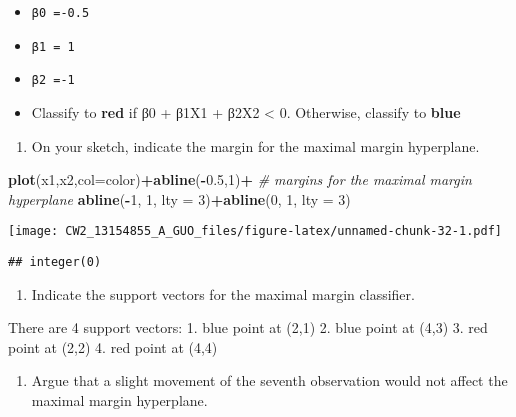 \documentclass[]{article}
\newenvironment{Shaded}{\begin{snugshade}}{\end{snugshade}}
\newcommand{\KeywordTok}[1]{\textcolor[rgb]{0.13,0.29,0.53}{\textbf{#1}}}
\newcommand{\DataTypeTok}[1]{\textcolor[rgb]{0.13,0.29,0.53}{#1}}
\newcommand{\DecValTok}[1]{\textcolor[rgb]{0.00,0.00,0.81}{#1}}
\newcommand{\FloatTok}[1]{\textcolor[rgb]{0.00,0.00,0.81}{#1}}
\newcommand{\StringTok}[1]{\textcolor[rgb]{0.31,0.60,0.02}{#1}}
\newcommand{\CommentTok}[1]{\textcolor[rgb]{0.56,0.35,0.01}{\textit{#1}}}
\newcommand{\OperatorTok}[1]{\textcolor[rgb]{0.81,0.36,0.00}{\textbf{#1}}}
\newcommand{\NormalTok}[1]{#1}
\providecommand{\tightlist}{%
  \setlength{\itemsep}{0pt}\setlength{\parskip}{0pt}}
\begin{document}
\begin{itemize}
\item
  \texttt{β0\ =-0.5}
\item
  \texttt{β1\ =\ 1}
\item
  \texttt{β2\ =-1}
\item
  Classify to \textbf{red} if β0 + β1X1 + β2X2 \textless{} 0. Otherwise,
  classify to \textbf{blue}
\end{itemize}

\begin{enumerate}
\def\labelenumi{(\alph{enumi})}
\setcounter{enumi}{3}
\tightlist
\item
  On your sketch, indicate the margin for the maximal margin hyperplane.
\end{enumerate}

\begin{Shaded}
\begin{Highlighting}[]
\KeywordTok{plot}\NormalTok{(x1,x2,}\DataTypeTok{col=}\NormalTok{color)}\OperatorTok{+}\KeywordTok{abline}\NormalTok{(}\OperatorTok{-}\FloatTok{0.5}\NormalTok{,}\DecValTok{1}\NormalTok{)}\OperatorTok{+}
\StringTok{        }\CommentTok{# margins for the maximal margin hyperplane}
\StringTok{        }\KeywordTok{abline}\NormalTok{(}\OperatorTok{-}\DecValTok{1}\NormalTok{, }\DecValTok{1}\NormalTok{, }\DataTypeTok{lty =} \DecValTok{3}\NormalTok{)}\OperatorTok{+}\KeywordTok{abline}\NormalTok{(}\DecValTok{0}\NormalTok{, }\DecValTok{1}\NormalTok{, }\DataTypeTok{lty =} \DecValTok{3}\NormalTok{)}
\end{Highlighting}
\end{Shaded}

\texttt{[image: CW2\_13154855\_A\_GUO\_files/figure-latex/unnamed-chunk-32-1.pdf]}

\begin{verbatim}
## integer(0)
\end{verbatim}

\begin{enumerate}
\def\labelenumi{(\alph{enumi})}
\setcounter{enumi}{4}
\tightlist
\item
  Indicate the support vectors for the maximal margin classifier.
\end{enumerate}

There are 4 support vectors: 1. blue point at (2,1) 2. blue point at
(4,3) 3. red point at (2,2) 4. red point at (4,4)

\begin{enumerate}
\def\labelenumi{(\alph{enumi})}
\setcounter{enumi}{5}
\tightlist
\item
  Argue that a slight movement of the seventh observation would not
  affect the maximal margin hyperplane.
\end{enumerate}
\end{document}
